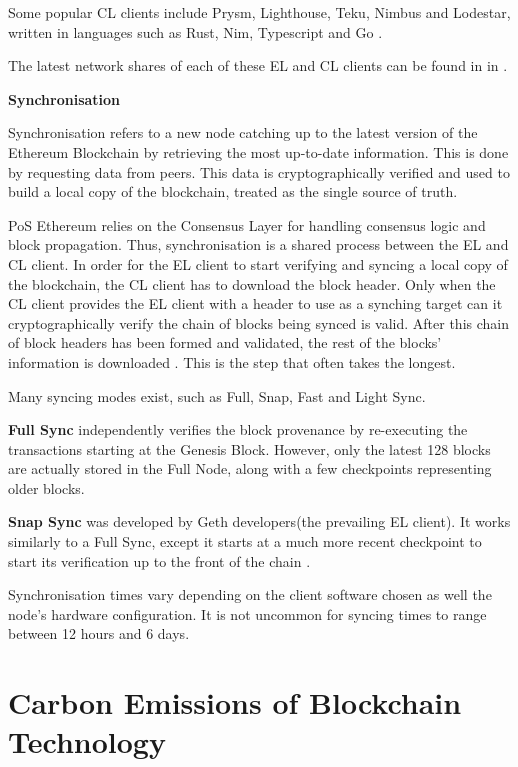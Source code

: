 Some popular CL clients include Prysm, Lighthouse, Teku, Nimbus and Lodestar, written in languages such as Rust, Nim, Typescript and Go \cite{EthereumEthereum.org}. 

The latest network shares of each of these EL and CL clients can be found in  in .

\textbf{Synchronisation} 

Synchronisation refers to a new node catching up to the latest version of the Ethereum Blockchain by retrieving the most up-to-date information. This is done by requesting data from peers. This data is cryptographically verified and used to build a local copy of the blockchain, treated as the single source of truth.

PoS Ethereum relies on the Consensus Layer for handling consensus logic and block propagation. Thus, synchronisation is a shared process between the EL and CL client. In order for the EL client to start verifying and syncing a local copy of the blockchain, the CL client has to download the block header. Only when the CL client provides the EL client with a header to use as a synching target can it cryptographically verify the chain of blocks being synced is valid. After this chain of block headers has been formed and validated, the rest of the blocks' information is downloaded \cite{2022DeveloperGo-ethereum}. This is the step that often takes the longest.

Many syncing modes exist, such as Full, Snap, Fast and Light Sync.

\textbf{Full Sync }independently verifies the block provenance by re-executing the transactions starting at the Genesis Block. However, only the latest 128 blocks are actually stored in the Full Node, along with a few checkpoints representing older blocks. 

\textbf{Snap Sync }was developed by Geth developers(the prevailing EL client). It works similarly to a Full Sync, except it starts at a much more recent checkpoint to start its verification up to the front of the chain \cite{2022DeveloperGo-ethereum}.

Synchronisation times vary depending on the client software chosen as well the node's hardware configuration. It is not uncommon for syncing times to range between 12 hours and 6 days.



\section{Carbon Emissions of Blockchain Technology }

